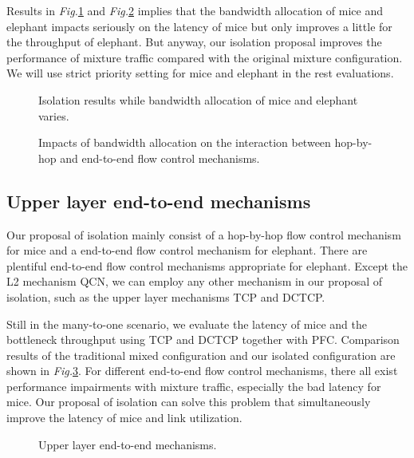 \documentclass[]{sig-alternate-10pt}
\begin{document}
Results in \emph{Fig.}\ref{fig:ets} and \emph{Fig.}\ref{fig:ets-inter} implies that the bandwidth allocation of mice and elephant impacts seriously on the latency of mice but only improves a little for the throughput of elephant.
But anyway, our isolation proposal improves the performance of mixture traffic compared with the original mixture configuration. 
We will use strict priority setting for mice and elephant in the rest evaluations.
\begin{figure}[t]
	\centering
	\hfill
	\caption{Isolation results while bandwidth allocation of mice and elephant varies. }
	\label{fig:ets}
\end{figure}

\begin{figure}[t]
	\centering
	\hfill
	\caption{Impacts of bandwidth allocation on the interaction between hop-by-hop and end-to-end flow control mechanisms. }
	\label{fig:ets-inter}
\end{figure}
\subsection{Upper layer end-to-end mechanisms}
Our proposal of isolation mainly consist of a hop-by-hop flow control mechanism for mice and a end-to-end flow control mechanism for elephant.
There are plentiful end-to-end flow control mechanisms appropriate for elephant. Except the L2 mechanism QCN, we can employ any other mechanism in our proposal of isolation, such as the upper layer mechanisms TCP and DCTCP.

Still in the many-to-one scenario, we evaluate the latency of mice and the bottleneck throughput using TCP and DCTCP together with PFC.
Comparison results of the traditional mixed configuration and our isolated configuration are shown in \emph{Fig.}\ref{fig:extend}.
For different end-to-end flow control mechanisms, there all exist performance impairments with mixture traffic, especially the bad latency for mice.   Our proposal of isolation can solve this problem that simultaneously improve the latency of mice and link utilization.

\begin{figure}[tp]
	\centering
	\caption{Upper layer end-to-end mechanisms.}
	\label{fig:extend}
\end{figure}
\end{document}
